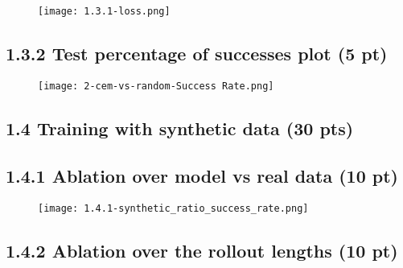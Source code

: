 \documentclass[12pt]{article}
\begin{document}
\begin{tcolorbox}[fit,height=30em, width=40em, blank, borderline={1pt}{1pt},nobeforeafter]
\begin{center}
    \begin{figure}[H]
        \centering
        \texttt{[image: 1.3.1-loss.png]}
        \label{fig:placeholder}
    \end{figure}
\end{center}
\end{tcolorbox}

\subsection*{1.3.2 Test percentage of successes plot (5 pt)}

\begin{tcolorbox}[fit,height=30em, width=40em, blank, borderline={1pt}{1pt},nobeforeafter]
\begin{center}
    \begin{figure}[H]
        \centering
        \texttt{[image: 2-cem-vs-random-Success Rate.png]}
        \label{fig:placeholder}
    \end{figure}
\end{center}
\end{tcolorbox}

\subsection*{1.4 Training with synthetic data (30 pts)}

\subsection*{1.4.1 Ablation over model vs real data (10 pt)}
\begin{tcolorbox}[fit,height=30em, width=40em, blank, borderline={1pt}{1pt},nobeforeafter]
\begin{center}
     \begin{figure}[H]
        \centering
        \texttt{[image: 1.4.1-synthetic\_ratio\_success\_rate.png]}
        \label{fig:placeholder}
    \end{figure}
\end{center}
\end{tcolorbox}

\subsection*{1.4.2 Ablation over the rollout lengths (10 pt)}
\end{document}

